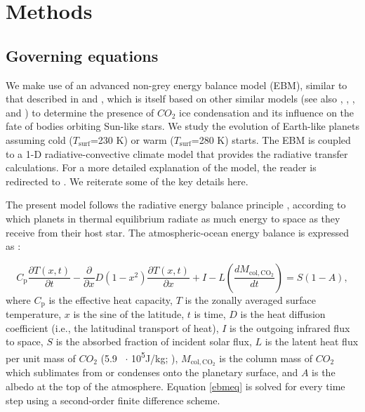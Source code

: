 \documentclass[fleqn,usenatbib]{mnras}
\begin{document}
\section{Methods}
\label{sec:Methods}
\subsection{Governing equations}
We make use of an advanced non-grey energy balance model (EBM), similar to that described in \citet{RamirezLevi2018} and \cite{ramirez2020}, which is itself based on  other similar models (see also \citet{North1979},  \citet{North1981}, \citet{Williams1997}, and \citet{vladilo2013}) to determine the presence of $CO_{\mathrm{2}}$ ice condensation and its influence on the fate of bodies orbiting Sun-like stars. We study the evolution of Earth-like planets assuming cold ($T_{\mathrm{surf}}$=230 K) or warm ($T_{\mathrm{surf}}$=280 K) starts. The EBM is coupled to a 1-D radiative-convective climate model that provides the radiative transfer calculations. For a more detailed explanation of the model, the reader is redirected to \citet{ramirez2020}. We reiterate some of the key details here.

The present model follows the radiative energy balance principle \citep[e.g.,][]{Williams1997}, according to which planets in thermal equilibrium radiate as much energy to space as they receive from their host star. The atmospheric-ocean energy balance is expressed as \citep[e.g.,][]{james1982,Williams1997,batalha2016}: 

\begin{equation}
\label{ebmeq}
    C_{\mathrm{p}} \frac{\partial T(x, t)}{\partial t}-\frac{\partial}{\partial x} D\left(1-x^{2}\right) \frac{\partial T(x, t)}{\partial x}+I-L\left (\frac{dM_{\mathrm{col,CO_{\mathrm{2}}}}}{dt}\right )=S(1-A),
\end{equation}{}
where $C_{\mathrm{p}}$ is the effective heat capacity, $T$ is the zonally averaged surface temperature, $x$ is the sine of the latitude, $t$ is time, $D$ is the heat diffusion coefficient (i.e., the latitudinal transport of heat), $I$ is the outgoing infrared flux to space, $S$ is the absorbed fraction of incident solar flux, $L$ is the latent heat flux per unit mass of $CO_{\mathrm{2}}$ (5.9 \ $\cdot$ 10\textsuperscript{5}J/kg; \citet{forget1998}), $M_{\mathrm{col,CO_{\mathrm{2}}}}$ is the column mass of $CO_{\mathrm{2}}$ which sublimates from or condenses onto the planetary surface, and $A$ is the albedo at the top of the atmosphere. Equation \ref{ebmeq} is solved for every time step using a second-order finite difference scheme.
\end{document}
